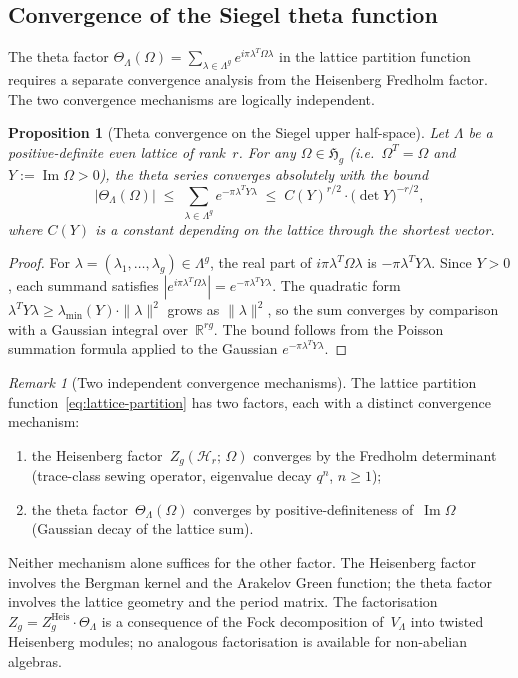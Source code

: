 \documentclass[11pt,reqno]{amsart}
\newtheorem{proposition}[theorem]{Proposition}
\theoremstyle{definition}
\theoremstyle{remark}
\newtheorem{remark}[theorem]{Remark}
\newcommand{\cH}{\mathcal{H}}
\newcommand{\bR}{\mathbb{R}}
\newcommand{\fH}{\mathfrak{H}}
\numberwithin{equation}{section}
\begin{document}
\subsection{Convergence of the Siegel theta
 function}\label{subsec:theta-convergence}

The theta factor $\Theta_\Lambda(\Omega)
= \sum_{\lambda \in \Lambda^g}
e^{i\pi\lambda^T\Omega\lambda}$ in the lattice partition
function requires a separate convergence analysis from the
Heisenberg Fredholm factor.  The two convergence mechanisms are
logically independent.

\begin{proposition}[Theta convergence on the Siegel upper
 half-space]\label{prop:theta-convergence}
Let $\Lambda$ be a positive-definite even lattice of rank~$r$.
For any $\Omega \in \fH_g$
(i.e.\ $\Omega^T = \Omega$ and
$Y := \operatorname{Im}\Omega > 0$), the theta series
converges absolutely with the bound
\begin{equation}\label{eq:theta-bound}
|\Theta_\Lambda(\Omega)|
\;\leq\;
\sum_{\lambda \in \Lambda^g}
e^{-\pi\lambda^T Y\lambda}
\;\leq\;
C(Y)^{r/2}
\cdot \bigl(\det Y\bigr)^{-r/2},
\end{equation}
where $C(Y)$ is a constant depending on the lattice through the
shortest vector.
\end{proposition}

\begin{proof}
For $\lambda = (\lambda_1,\ldots,\lambda_g) \in \Lambda^g$,
the real part of $i\pi\lambda^T\Omega\lambda$ is
$-\pi\lambda^T Y\lambda$.  Since $Y > 0$, each summand satisfies
$|e^{i\pi\lambda^T\Omega\lambda}|
= e^{-\pi\lambda^T Y\lambda}$.
The quadratic form
$\lambda^T Y\lambda
\geq \lambda_{\min}(Y)
\cdot \|\lambda\|^2$
grows as $\|\lambda\|^2$, so the sum converges by comparison
with a Gaussian integral over~$\bR^{rg}$.  The bound follows
from the Poisson summation formula applied to the Gaussian
$e^{-\pi\lambda^T Y\lambda}$.
\end{proof}

\begin{remark}[Two independent convergence
 mechanisms]\label{rem:two-mechanisms}
The lattice partition function~\eqref{eq:lattice-partition}
has two factors, each with a distinct convergence mechanism:
\begin{enumerate}[label=\textup{(\alph*)}]
\item the Heisenberg factor~$Z_g(\cH_r;\,\Omega)$ converges by
 the Fredholm determinant (trace-class sewing operator,
 eigenvalue decay $q^n$, $n \geq 1$);
\item the theta factor~$\Theta_\Lambda(\Omega)$ converges by
 positive-definiteness of~$\operatorname{Im}\Omega$
 (Gaussian decay of the lattice sum).
\end{enumerate}
Neither mechanism alone suffices for the other factor.  The
Heisenberg factor involves the Bergman kernel and the Arakelov
Green function; the theta factor involves the lattice geometry
and the period matrix.  The factorisation
$Z_g = Z_g^{\mathrm{Heis}} \cdot \Theta_\Lambda$ is a
consequence of the Fock decomposition of~$V_\Lambda$ into
twisted Heisenberg modules; no analogous factorisation is
available for non-abelian algebras.
\end{remark}
\end{document}
